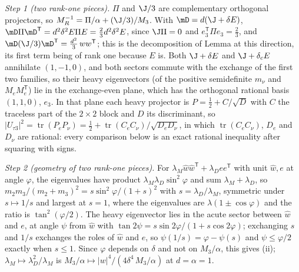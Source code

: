 \emph{Step 1 (two rank-one pieces).} $\Pi$ and $\J/3$ are complementary orthogonal projectors, so $M_{R}^{-1} = \Pi/\alpha + (\J/3)/M_{3}$. With $\mD = d(\J + \delta E)$, $\mD\Pi\mD^{\mathsf{T}} = d^{2}\delta^{2}E\Pi E = \tfrac23 d^{2}\delta^{2}E$, since $\J\Pi = 0$ and $e_{3}^{\mathsf{T}}\Pi e_{3} = \tfrac23$, and $\mD(\J/3)\mD^{\mathsf{T}} = \tfrac{d^{2}}{3}\,w w^{\mathsf{T}}$; this is the decomposition of Lemma  at this direction, its first term being of rank one because $E$ is. Both $\J + \delta E$ and $\J + \delta_{c}E$ annihilate $(1,-1,0)$, and both sectors commute with the exchange of the first two families, so their heavy eigenvectors (of the positive semidefinite $m_{\nu}$ and $M_{e}M_{e}^{\mathsf{T}}$) lie in the exchange-even plane, which has the orthogonal rational basis $(1,1,0)$, $e_{3}$. In that plane each heavy projector is $P = \tfrac12 + C/\sqrt{D}$ with $C$ the traceless part of the $2 \times 2$ block and $D$ its discriminant, so $|U_{\tau 3}|^{2} = \operatorname{tr}(P_{e}P_{\nu}) = \tfrac12 + \operatorname{tr}(C_{e}C_{\nu})/\sqrt{D_{e}D_{\nu}}$, in which $\operatorname{tr}(C_{e}C_{\nu})$, $D_{e}$ and $D_{\nu}$ are rational: every comparison below is an exact rational inequality after squaring with signs.

\emph{Step 2 (geometry of two rank-one pieces).} For $\lambda_{M}\hat{w}\hat{w}^{\mathsf{T}} + \lambda_{D}ee^{\mathsf{T}}$ with unit $\hat{w}, e$ at angle $\varphi$, the eigenvalues have product $\lambda_{M}\lambda_{D}\sin^{2}\varphi$ and sum $\lambda_{M} + \lambda_{D}$, so $m_{2}m_{3}/(m_{2} + m_{3})^{2} = s\sin^{2}\varphi/(1 + s)^{2}$ with $s = \lambda_{D}/\lambda_{M}$, symmetric under $s \mapsto 1/s$ and largest at $s = 1$, where the eigenvalues are $\lambda(1 \pm \cos\varphi)$ and the ratio is $\tan^{2}(\varphi/2)$. The heavy eigenvector lies in the acute sector between $\hat{w}$ and $e$, at angle $\psi$ from $\hat{w}$ with $\tan 2\psi = s\sin 2\varphi/(1 + s\cos 2\varphi)$; exchanging $s$ and $1/s$ exchanges the roles of $\hat{w}$ and $e$, so $\psi(1/s) = \varphi - \psi(s)$ and $\psi \le \varphi/2$ exactly when $s \le 1$. Since $\varphi$ depends on $\delta$ and not on $M_{3}/\alpha$, this gives (ii); $\lambda_{M} \mapsto \lambda_{D}^{2}/\lambda_{M}$ is $M_{3}/\alpha \mapsto |w|^{4}/(4\delta^{4}\,M_{3}/\alpha)$ at $d = \alpha = 1$.

